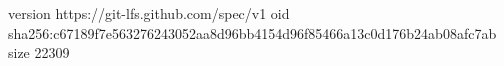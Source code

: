 version https://git-lfs.github.com/spec/v1
oid sha256:c67189f7e563276243052aa8d96bb4154d96f85466a13c0d176b24ab08afc7ab
size 22309
